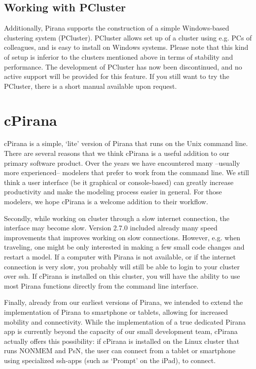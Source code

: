 {{{{\section{Working with PCluster}
Additionally, Pirana supports the construction of a simple
Windows-based clustering system (PCluster). PCluster allows set up of a cluster using
e.g. PCs of colleagues, and is easy to install on Windows systems.
Please note that this kind of setup is inferior to the clusters
mentioned above in terms of stability and performance. The development of PCluster has now been
discontinued, and no active support will be provided for this
feature. If you still want to try the PCluster, there is a short
manual available upon request.




\chapter{cPirana}
cPirana is a simple, `lite' version of Pirana that runs on the Unix command line.
There are several reasons that we think cPirana is a useful addition to our primary software product.
Over the years we have encountered many --usually more experienced--
modelers that prefer to work from the command line. We still think a user interface (be it graphical or
console-based) can greatly increase productivity and make the modeling process
easier in general. For those modelers, we hope cPirana is a welcome addition to their workflow.

\vspace{10pt}

\noindent Secondly, while working on cluster through a slow internet connection, the interface may become slow.
Version 2.7.0 included already many speed improvements that improves working on slow connections. However,
e.g. when traveling, one might be only interested in making a few small code changes and restart a model.
If a computer with Pirana is not available, or if the internet connection is very slow, you probably will still
be able to login to your cluster over ssh. If cPirana is installed on this cluster, you will have the ability to
use most Pirana functions directly from the command line interface.

\vspace{10pt}

\noindent Finally, already from our earliest versions of Pirana, we intended to extend the implementation
of Pirana to smartphone or tablets, allowing for increased mobility
and connectivity. While the implementation of a true dedicated Pirana
app is currently beyond the capacity of our small development team, cPirana
actually offers this possibility: if cPirana is installed on the Linux
cluster that runs NONMEM and PsN, the user can connect from a tablet
or smartphone using specialized ssh-apps (such as `Prompt' on the
iPad), to connect.

}}}}

